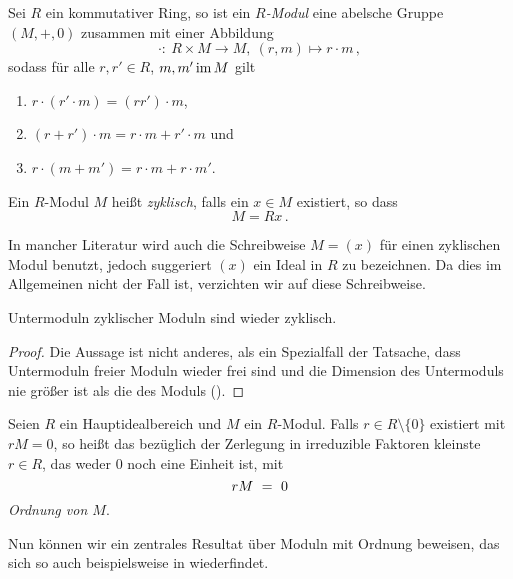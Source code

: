 \begin{definition}[Modul]
  Sei $R$ ein kommutativer Ring, so ist ein \emph{$R$-Modul}
  eine abelsche Gruppe $(M,+,0)$ zusammen mit einer 
  Abbildung 
  \[ \cdot:\ R \times M \to M,\ (r,m) \mapsto r\cdot m\,,\]
  sodass für alle $r, r' \in R$, $m,m' \operatorname{im} M$ gilt
  \begin{enumerate}
    \item $r\cdot (r'\cdot m) = (rr')\cdot m$,
    \item $(r+r')\cdot m = r\cdot m + r'\cdot m$ und 
    \item $r\cdot(m+m') = r\cdot m + r\cdot m'$.
  \end{enumerate}
\end{definition}


\begin{definition}
  Ein $R$-Modul $M$ heißt \emph{zyklisch}, falls
  ein $x\in M$ existiert, so dass
  \[ M = Rx\,.\]
\end{definition}

\begin{bemerkung}
  In mancher Literatur wird auch die Schreibweise $M = (x)$ für einen
  zyklischen Modul benutzt, jedoch suggeriert $(x)$ ein Ideal in $R$ zu
  bezeichnen. Da dies im Allgemeinen nicht der Fall ist, verzichten wir auf
  diese Schreibweise.
\end{bemerkung}


\begin{satz}
  \label{satz:untermoduln_bleiben_zyklisch}
  Untermoduln zyklischer Moduln sind wieder zyklisch.
\end{satz}
\begin{proof}
  Die Aussage ist nicht anderes, als ein Spezialfall der Tatsache, dass
  Untermoduln freier Moduln wieder frei sind und die Dimension des Untermoduls
  nie größer ist als die des Moduls 
  (\autocite[Theorem 7.1]{lang2002algebra}).
\end{proof}

\begin{definition}
  Seien $R$ ein Hauptidealbereich und $M$ ein $R$-Modul. 
  Falls $r \in R\setminus\{0\}$ existiert mit $rM = 0$, so heißt
  das bezüglich der Zerlegung in irreduzible Faktoren kleinste 
  $r \in R$, das weder $0$ noch eine Einheit ist, mit
  \[ rM \ =\  0\]
  \emph{Ordnung von $M$}.
\end{definition}

Nun können wir ein zentrales Resultat über Moduln mit Ordnung beweisen, das
sich so auch beispielsweise in \autocite[Lemma 8.10]{hartley1974rings}
wiederfindet.


